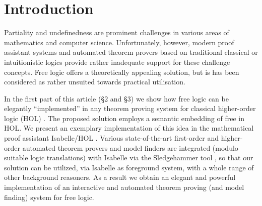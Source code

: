 \section{Introduction}
\label{intro}
Partiality and undefinedness are prominent challenges in various areas
of mathematics and computer science.  Unfortunately, however, modern
proof assistant systems and automated theorem provers based on
traditional classical or intuitionistic logics provide rather
inadequate support for these challenge concepts.  Free logic \cite{Lambert60,Scott67,lambert02:_free_logic,sep-logic-free} offers a
theoretically appealing solution, but is has been considered as rather
unsuited towards practical utilisation.


In the first part of this article (\S2 and \S3) we show how free logic
can be elegantly ``implemented'' in any theorem proving system for
classical higher-order logic (HOL) \cite{B5}. The proposed solution
employs a semantic embedding of free in HOL. We
present an exemplary implementation of this idea in the mathematical
proof assistant Isabelle/HOL \cite{NPW02}. Various state-of-the-art
first-order and higher-order automated theorem provers and model
finders are integrated (modulo suitable logic translations) with
Isabelle via the Sledgehammer tool \cite{Sledgehammer}, so that our
solution can be utilized, via Isabelle as foreground system, with a
whole range of other background reasoners. As a result we obtain an
elegant and powerful implementation of an interactive and automated
theorem proving (and model finding) system for free logic.





 
